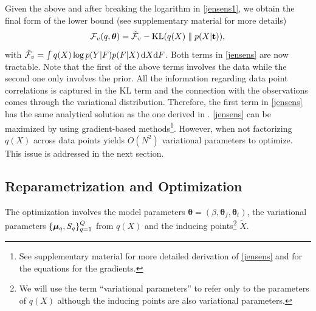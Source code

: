 \documentclass{article} %
\begin{document}
Given the above and after breaking the logarithm in \eqref{jensens1},
we obtain the final form of the lower bound (see supplementary
material for more details)
%
\begin{equation}
\label{jensens}
\mathcal{F}_v(q, \boldsymbol \theta) = 
\hat{\mathcal{F}}_v - \text{KL}(q(X) \parallel p(X|\mathbf{t})),
\end{equation}
%
with $\hat{\mathcal{F}}_v =\int q(X) \log p( Y | F ) p( F | X) \,
\mathrm{d} X \text{d} F$. Both terms in \eqref{jensens} are now
tractable. Note that the first of the above terms involves the data while
the second one only involves the prior. All the information regarding
data point correlations is captured in the $\text{KL}$ term and the
connection with the observations comes through the variational
distribution. Therefore, the first term in \eqref{jensens} has the
same analytical solution as the one derived in \cite{BayesianGPLVM}.
%
\eqref{jensens} can be maximized by using gradient-based
methods\footnote{See supplementary material for more detailed
  derivation of \eqref{jensens} and for the equations for the
  gradients.}. However, when not factorizing $q(X)$ across data points
yields $O(N^2)$ variational parameters to optimize. 
This issue is addressed in the next section.



\subsection{Reparametrization and Optimization \label{optimisation}} 

The optimization involves the model parameters $\boldsymbol \theta =
(\beta, \boldsymbol \theta_f, \boldsymbol \theta_t)$, the variational
parameters $\{ \boldsymbol \mu_q, S_q \}_{q=1}^Q$ from $q(X)$ and the inducing
points\footnote{We will use the term ``variational parameters'' to
  refer only to the parameters of $q(X)$ although the inducing points
  are also variational parameters.} $\tilde{X}$.
\end{document}
